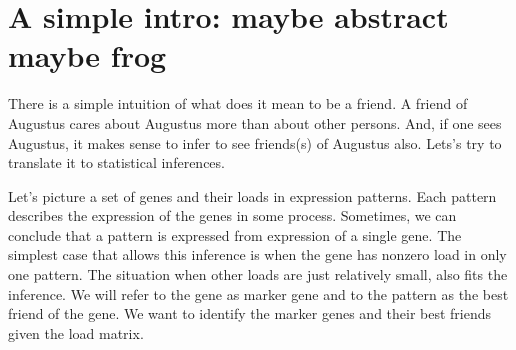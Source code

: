 \documentclass{llncs}
\begin{document}
\begin{abstract}

\textcolor{green}{We define a tag's most friendly cloud as a cloud that pays maximal rank-normalized attention to the tag.}
Suppose we have a set of {\tag}s and a set of fuzzy set of {\tag}s, which we will refer to as {\cloud}s, and a we have the {\tag}-to-{\cloud} relation quantified as a scalar for each $\left( {\tag},{\cloud}\right)$ pair. An example is: {\tag}s are genes, {\cloud}s are gene expression patterns, and the scalars are loads of the genes in the patterns. Sometimes, observation that a gene is expressed implies expression of a particular pattern (the simplest case is: the gene has nonzero load only in that pattern). If so, we say that the gene marks the pattern. Here we describe a statistical test that identify pairs of a marker {\tag} and the marked {\cloud}. The test is based on rank statistics and it does not rely on propositions about the distribution of the relation quantity. The marked {\cloud} is referred to as the {\tag}'s best friend, and the test is named "the best friends test" or "the gene's best friends test". The statistics is naturally expand to the case when a {\tag} selects (separates) a subset of {\cloud}s, thus having more than one best friend. The code (currently, only R) is available at \url{https://github.com/favorov/best-friends}
\end{abstract}
%
\section{A simple intro: maybe abstract maybe frog}

There is a simple intuition of what does it mean to be a friend. A friend of Augustus cares about Augustus more than about other persons. And, if one sees Augustus, it makes sense to infer to see friends(s) of Augustus also. Lets’s try to translate it to statistical inferences.

Let's picture a set of genes and their loads in expression patterns. Each pattern describes the expression of the genes in some process. Sometimes, we can conclude that a pattern is expressed from expression of a single gene. The simplest case that allows this inference is when the gene has nonzero load in only one pattern. The situation when other loads are just relatively small, also fits the inference. We will refer to the gene as marker gene and to the pattern as the best friend of the gene. We want to identify the marker genes and their best friends given the load matrix.
\end{document}
